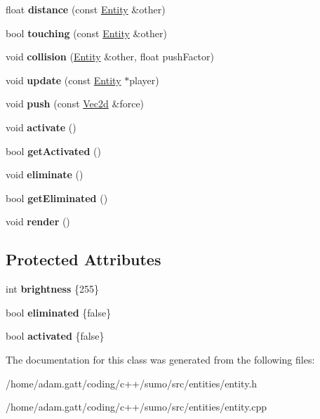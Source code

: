 \begin{DoxyCompactItemize}
float {\bfseries distance} (const \hyperlink{classEntity}{Entity} \&other)
\item 
\mbox{\label{classEntity_a9d4cd9cf0a133967c5eb0872bed8079e}} 
bool {\bfseries touching} (const \hyperlink{classEntity}{Entity} \&other)
\item 
\mbox{\label{classEntity_a6d88e5b1c07d2a22bfb6a12ae183e141}} 
void {\bfseries collision} (\hyperlink{classEntity}{Entity} \&other, float push\+Factor)
\item 
\mbox{\label{classEntity_ad81d41489a4fbf25201293403a786372}} 
void {\bfseries update} (const \hyperlink{classEntity}{Entity} $\ast$player)
\item 
\mbox{\label{classEntity_ac607d450214fd15bc05995bd2f1b5a08}} 
void {\bfseries push} (const \hyperlink{classVec2d}{Vec2d} \&force)
\item 
\mbox{\label{classEntity_a95079be1c9fa9f109dd3cf7446eeeb1d}} 
void {\bfseries activate} ()
\item 
\mbox{\label{classEntity_a3418c165a12f2358d906f3dd2c37d828}} 
bool {\bfseries get\+Activated} ()
\item 
\mbox{\label{classEntity_a96085ede5f99015b1272f3b0534c065b}} 
void {\bfseries eliminate} ()
\item 
\mbox{\label{classEntity_a95f8355a78eeedbf58e6ff1f30cb30ac}} 
bool {\bfseries get\+Eliminated} ()
\item 
\mbox{\label{classEntity_af5ca41372ff108e4c044e8d927995a27}} 
void {\bfseries render} ()
\end{DoxyCompactItemize}
\subsection*{Protected Attributes}
\begin{DoxyCompactItemize}
\item 
\mbox{\label{classEntity_acc69f951f74ed4ae1467b137fa2dc378}} 
int {\bfseries brightness} \{255\}
\item 
\mbox{\label{classEntity_a89860ce4bf04642ea9a5e15bf70297f3}} 
bool {\bfseries eliminated} \{false\}
\item 
\mbox{\label{classEntity_a8c8eb7c8f1046c009b1c3f4f0d6d87c2}} 
bool {\bfseries activated} \{false\}
\end{DoxyCompactItemize}


The documentation for this class was generated from the following files\+:\begin{DoxyCompactItemize}
\item 
/home/adam.\+gatt/coding/c++/sumo/src/entities/entity.\+h\item 
/home/adam.\+gatt/coding/c++/sumo/src/entities/entity.\+cpp\end{DoxyCompactItemize}
